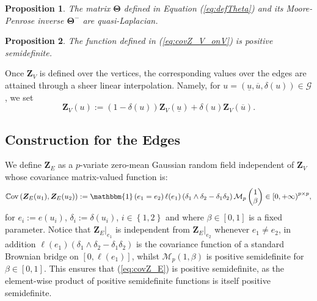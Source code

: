\documentclass[12pt]{article}
\theoremstyle{plain}
\newtheorem{proposition}{Proposition}
\theoremstyle{remark}
\newcommand{\round}[1]{\left( #1 \right)}
\renewcommand{\square}[1]{\left[ #1\right]}
\newcommand{\curly}[1]{\left\{ #1 \right\}}
\newcommand{\Cov}[2]{\mathbb{C}{\rm ov}\round{#1,#2}}
\newcommand{\indOne}[0]{\mathbbm{1}}
\newcommand{\ul}[1]{\underline{#1}}
\newcommand{\ol}[1]{\overline{#1}}
\newcommand{\Mv}[3]{\mathcal{M}_{#1}\begin{pmatrix}
	#2\\
	#3
\end{pmatrix}}
\newcommand{\Mh}[3]{\mathcal{M}_{#1}\round{#2,#3}}
\newcommand{\grMatr}[1]{{\boldsymbol{#1}}}   %
\newcommand{\rVec}[1]{{\bm{#1}}}            %
\newcommand{\tobi}[1]{\textcolor{teal}{#1}}
\begin{document}
    \begin{proposition}
	\label{prop:ThetaQuasiLaplacian}
         The matrix $\grMatr \Theta$ defined in Equation (\ref{eq:defTheta}) and its Moore-Penrose inverse $\grMatr \Theta^-$ are quasi-Laplacian.
    \end{proposition}

    \begin{proposition}
        \label{prop:covZ_V_isACov}
        The function defined in (\ref{eq:covZ_V_onV}) is positive semidefinite.
    \end{proposition}

    Once $\rVec{Z}_V$ is defined over the vertices, the corresponding values over the edges are attained through a sheer linear interpolation. Namely, for $u=(\ul u, \ol u,\delta(u))\in \mathcal G$, we set 
    \begin{equation}
        \label{eq:interpZv}
        \rVec{Z}_V(u):=(1-\delta(u)) \rVec{Z}_V(\ul u) + \delta(u) \rVec{Z}_V(\ol u).
    \end{equation}
    
\subsection{Construction for the Edges}     
    \label{ssec:constructionZ_E}
    We define $\rVec{Z}_E$ as a $p$-variate zero-mean Gaussian random field independent of $\rVec{Z}_V$ whose covariance matrix-valued function is:
    \begin{equation}
        \label{eq:covZ_E}
        \Cov{\rVec{Z}_E(u_1)}{\rVec{Z}_E(u_2)}:=\indOne\round{e_1=e_2}\ell(e_1)\round{\delta_1 \wedge \delta_2 - \delta_1 \delta_2}\Mv{p}{1}{\beta} \in {[0,+\infty)}^{p\times p},
    \end{equation}
    for $e_i:=e(u_i)$, $\delta_i:={\delta}(u_i)$, $i\in\curly{1,2}$ and where $\beta\in\square{0,1}$ is a fixed parameter. Notice that $\rVec{Z}_E\big|_{e_1}$ is independent from $\rVec{Z}_E\big|_{e_2}$ whenever $e_1 \ne e_2$, in addition $\ell(e_1)\round{\delta_1 \wedge \delta_2 - \delta_1 \delta_2}$ is the covariance function of a standard Brownian bridge on $[0,\ell(e_1)]$, whilst $\Mh{p}{1}{\beta}$ is positive semidefinite for $\beta\in[0,1]$. This ensures that  (\ref{eq:covZ_E}) is positive semidefinite, as the {element-wise}  product of positive semidefinite functions is itself positive semidefinite.
    
\end{document}
